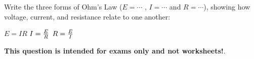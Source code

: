 

Write the three forms of Ohm's Law ($E = \cdots$ \hskip 10pt , $I = \cdots$ \hskip 10pt and $R = \cdots$), showing how voltage, current, and resistance relate to one another:







$E = IR$ \hskip 30pt $I = {E \over R}$ \hskip 30pt $R = {E \over I}$







{\bf This question is intended for exams only and not worksheets!}.



